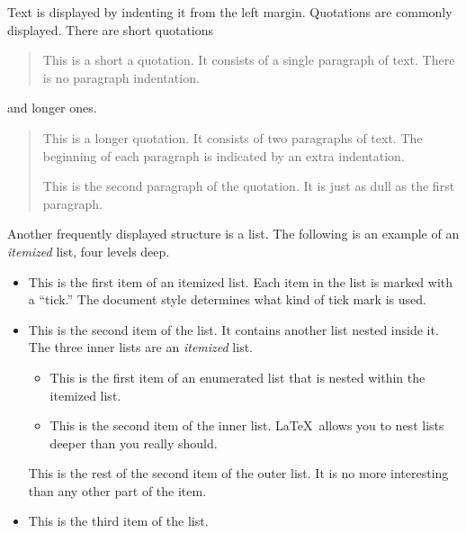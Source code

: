 \documentclass[book, 12pt]{phd}
\begin{document}
Text is displayed by indenting it from the left margin.
Quotations are commonly displayed.  There are short quotations
\begin{quote}
   This is a short a quotation.  It consists of a
   single paragraph of text.  There is no paragraph
   indentation.
\end{quote}
and longer ones.
\begin{quotation}
   This is a longer quotation.  It consists of two paragraphs
   of text.  The beginning of each paragraph is indicated
   by an extra indentation.

   This is the second paragraph of the quotation.  It is just
   as dull as the first paragraph.
\end{quotation}
Another frequently displayed structure is a list.
The following is an example of an {\em itemized} list, 
four levels deep.
\begin{itemize}
\item  This is the first item of an itemized list.  Each item
      in the list is marked with a ``tick.''  The document
      style determines what kind of tick mark is used.
\item  This is the second item of the list.  It contains another
      list nested inside it.  The three inner lists are an {\em itemized}
      list.
    \begin{itemize}
       \item This is the first item of an enumerated list that
            is nested within the itemized list.
          \item This is the second item of the inner list.  \LaTeX\
            allows you to nest lists deeper than you really should.
      \end{itemize}
      This is the rest of the second item of the outer list.  It
      is no more interesting than any other part of the item.
   \item  This is the third item of the list.
\end{itemize}
\end{document}
